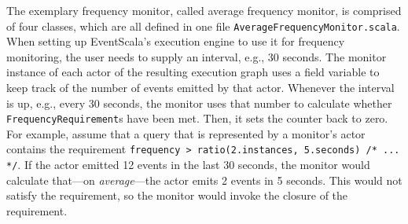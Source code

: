 \documentclass[article, 10pt, type=bsc, colorback, accentcolor=tud8b, parskip=half, bibliography=totocnumbered]{tudthesis}
\begin{document}
The exemplary frequency monitor, called average frequency monitor, is comprised of four classes, which are all defined in one file \lstinline{AverageFrequencyMonitor.scala}.
When setting up EventScala's execution engine to use it for frequency monitoring, the user needs to supply an interval, e.g., 30 seconds.
The monitor instance of each actor of the resulting execution graph uses a field variable to keep track of the number of events emitted by that actor.
Whenever the interval is up, e.g., every 30 seconds, the monitor uses that number to calculate whether \lstinline{FrequencyRequirement}s have been met.
Then, it sets the counter back to zero.
For example, assume that a query that is represented by a monitor's actor contains the requirement \lstinline{frequency > ratio(2.instances, 5.seconds) /* ... */}.
If the actor emitted 12 events in the last 30 seconds, the monitor would calculate that---on \emph{average}---the actor emits 2 events in 5 seconds.
This would not satisfy the requirement, so the monitor would invoke the closure of the requirement.
\end{document}

